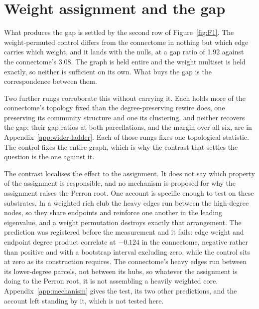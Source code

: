 

\section{Weight assignment and the gap}
\label{sec:act1-assignment}
\bigskip

What produces the gap is settled by the second row of Figure~\ref{fig:F1}. The
weight-permuted control differs from the connectome in nothing but which edge
carries which weight, and it lands with the nulls, at a gap ratio of
1.92 %
against the connectome's 3.08. %
The graph is held entire and the weight multiset is held exactly, so neither is
sufficient on its own. What buys the gap is the correspondence between them.

Two further rungs corroborate this without carrying it. Each holds more of the
connectome's topology fixed than the degree-preserving rewire does, one
preserving its community structure and one its clustering, and neither recovers
the gap; their gap ratios at both parcellations, and the margin over all six, 
are in Appendix~\ref{app:wider-ladder}. Each of those rungs fixes one
topological statistic. The control fixes the entire graph, which is why the
contrast that settles the question is the one against it.

The contrast localises the effect to the assignment. It does not say which
property of the assignment is responsible, and no mechanism is proposed for why
the assignment raises the Perron root. One account is specific enough to test on
these substrates. In a weighted rich club the heavy edges run between the
high-degree nodes, so they share endpoints and reinforce one another in the
leading eigenvalue, and a weight permutation destroys exactly that arrangement.
The prediction was registered before the measurement and it fails: edge weight
and endpoint degree product correlate at
$-0.124$ %
in the connectome, negative rather than positive and with a bootstrap interval
excluding zero, while the control sits at zero as its construction
requires. %
The connectome's heavy edges run between its lower-degree parcels, not between
its hubs, so whatever the assignment is doing to the Perron root, it is not
assembling a heavily weighted core. Appendix~\ref{app:mechanism} gives the test,
its two other predictions, and the account left standing by it, which is not
tested here.



